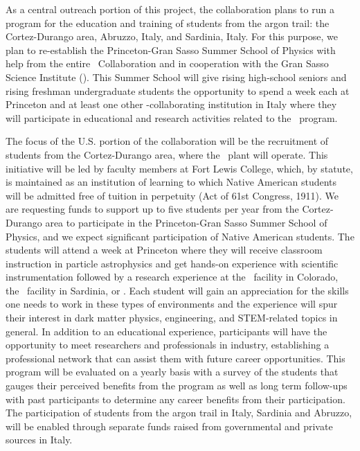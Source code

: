As a central outreach portion of this project, the collaboration plans to run a program for the education and training of students from the argon trail: the Cortez-Durango area, Abruzzo, Italy, and Sardinia, Italy. For this purpose, we plan to re-establish the Princeton-Gran Sasso Summer School of Physics with help from the entire \GADMC\ Collaboration and in cooperation with the Gran Sasso Science Institute (\GSSI). This Summer School will give rising high-school seniors and rising freshman undergraduate students the opportunity to spend a week each at Princeton and at least one other \DS-collaborating institution in Italy where they will participate in educational and research activities related to the \DSs\ program. 

The focus of the U.S. portion of the collaboration will be the recruitment of students from the Cortez-Durango area, where the \Urania\ plant will operate.  This initiative will be led by faculty members at Fort Lewis College, which, by statute, is maintained as an institution of learning to which Native American students will be admitted free of tuition in perpetuity (Act of 61st Congress, 1911). 
We are requesting funds to support up to five students per year from the Cortez-Durango area to participate in the Princeton-Gran Sasso Summer School of Physics, and we expect significant participation of Native American students.  The students will attend a week at Princeton where they will receive classroom instruction in particle astrophysics and get hands-on experience with scientific instrumentation followed by a research experience at the \Urania\ facility in Colorado, the \Aria\ facility in Sardinia, or \LNGS.  Each student will gain an appreciation for the skills one needs to work in these types of environments and the experience will spur their interest in dark matter physics, engineering, and STEM-related topics in general.  In addition to an educational experience, participants will have the opportunity to meet researchers and professionals in industry, establishing a professional network that can assist them with future career opportunities.  This program will be evaluated on a yearly basis with a survey of the students that gauges their perceived benefits from the program as well as long term follow-ups with past participants to determine any career benefits from their participation. The participation of students from the argon trail in Italy, Sardinia and Abruzzo, will be enabled through separate funds raised from governmental and private sources in Italy.

